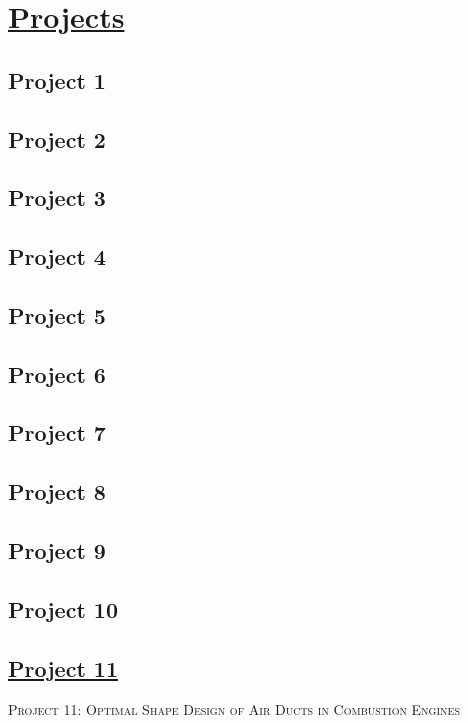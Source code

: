 \documentclass[onsided]{book}
\numberwithin{equation}{section}
\begin{document}

\chapter{\href{https://www.romsoc.eu/projects/}{Projects}}

\section{Project 1}

\section{Project 2}

\section{Project 3}

\section{Project 4}

\section{Project 5}

\section{Project 6}

\section{Project 7}

\section{Project 8}

\section{Project 9}

\section{Project 10}

\section{\href{https://www.romsoc.eu/optimal-shape-design-of-air-ducts-in-combustion-engines/}{Project 11}}
\begin{center}
    \textsc{Project 11: Optimal Shape Design of Air Ducts in Combustion Engines}
\end{center}
\end{document}
